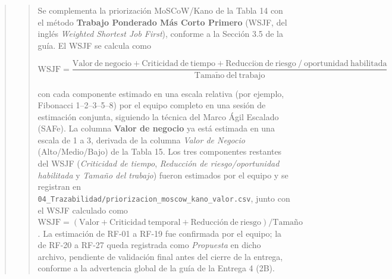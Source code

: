 \documentclass[
]{article}
\begin{document}
\begin{quote}
\begin{quote}
Se complementa la priorización MoSCoW/Kano de la Tabla 14 con el método
\textbf{Trabajo Ponderado Más Corto Primero} (WSJF, del inglés \emph{Weighted
Shortest Job First}), conforme a la Sección 3.5 de la guía. El WSJF se
calcula como
\begin{small}
\[
\mathrm{WSJF} = \frac{\mathrm{Valor\ de\ negocio} + \mathrm{Criticidad\ de\ tiempo} +
\mathrm{Reducci\acute{o}n\ de\ riesgo\ /\ oportunidad\ habilitada}}{\mathrm{Tama\tilde{n}o\ del\ trabajo}}
\]
\end{small}
con cada componente estimado en una escala relativa (por ejemplo, Fibonacci
1--2--3--5--8) por el equipo completo en una sesión de estimación conjunta,
siguiendo la técnica del Marco Ágil Escalado (SAFe). La columna \textbf{Valor
de negocio} ya está estimada en una escala de 1 a 3, derivada de la columna
\emph{Valor de Negocio} (Alto/Medio/Bajo) de la Tabla 15. Los tres
componentes restantes del WSJF (\emph{Criticidad de tiempo}, \emph{Reducción
de riesgo/oportunidad habilitada} y \emph{Tamaño del trabajo}) fueron
estimados por el equipo y se registran en
\texttt{04\_Trazabilidad/priorizacion\_moscow\_kano\_valor.csv},
junto con el WSJF calculado como
$\mathrm{WSJF} = (\mathrm{Valor} + \mathrm{Criticidad\ temporal} + \mathrm{Reducción\ de\ riesgo}) / \mathrm{Tamaño}$.
La estimación de RF-01 a RF-19 fue confirmada por el equipo; la de RF-20 a
RF-27 queda registrada como \emph{Propuesta} en dicho archivo, pendiente de
validación final antes del cierre de la entrega, conforme a la advertencia
global de la guía de la Entrega 4 (2B).
\end{quote}


\end{quote}
\end{document}
